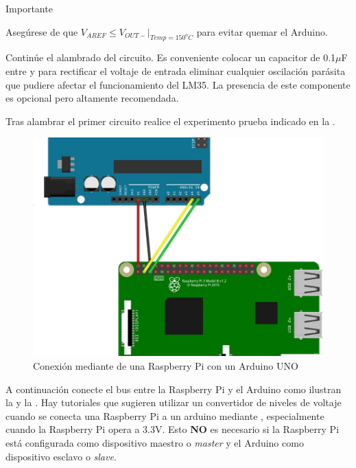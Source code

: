 \medskip
\begin{importantbox}{\large Importante}
	\begin{center}
		Asegúrese de que $V_{AREF} \leq V_{OUT-}\Big|_{Temp=150^{o}C}$ para evitar quemar el Arduino.
	\end{center}
\end{importantbox}
\medskip

Continúe el alambrado del circuito.
Es conveniente colocar un capacitor de 0.1$\mu$F entre \VCC y \GND para rectificar el voltaje de entrada eliminar cualquier oscilación parásita que pudiere afectar el funcionamiento del LM35.
La presencia de este componente es opcional pero altamente recomendada.

\medskip
Tras alambrar el primer circuito realice el experimento prueba indicado en la .
\medskip

\begin{figure}
	\vspace{-5mm}
	\centering
	\includegraphics[width=\linewidth]{img/pi-arduino-i2c.png}
	\caption[Conexión de una Raspberry Pi con un Arduino UNO via \IIC]{Conexión mediante \IIC de una Raspberry Pi con un Arduino UNO\footnotemark}%
	\label{fig:pi-arduino-i2c} %
\end{figure}

A continuación conecte el bus \IIC entre la Raspberry Pi y el Arduino como ilustran la  y la .
Hay tutoriales que sugieren utilizar un convertidor de niveles de voltaje cuando se conecta una Raspberry Pi a un arduino mediante \IIC, especialmente cuando la Raspberry Pi opera a 3.3V.
Esto \textbf{NO} es necesario si la Raspberry Pi está configurada como dispositivo maestro o \emph{master} y el Arduino como dispositivo esclavo o \emph{slave}.


